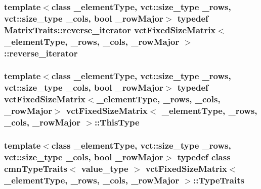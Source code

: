\hypertarget{classvct_fixed_size_matrix_afd9b320069fbb9b20f3dc11d767b57c9}{
\subsubsection[{reverse\-\_\-iterator}]{\setlength{\rightskip}{0pt plus 5cm}template$<$class \-\_\-element\-Type, vct\-::size\-\_\-type \-\_\-rows, vct\-::size\-\_\-type \-\_\-cols, bool \-\_\-row\-Major$>$ typedef {\bf Matrix\-Traits\-::reverse\-\_\-iterator} {\bf vct\-Fixed\-Size\-Matrix}$<$ \-\_\-element\-Type, \-\_\-rows, \-\_\-cols, \-\_\-row\-Major $>$\-::{\bf reverse\-\_\-iterator}}}\label{classvct_fixed_size_matrix_afd9b320069fbb9b20f3dc11d767b57c9}
\hypertarget{classvct_fixed_size_matrix_a45edd9a8b579712a59b766f04e1acfec}{
\subsubsection[{This\-Type}]{\setlength{\rightskip}{0pt plus 5cm}template$<$class \-\_\-element\-Type, vct\-::size\-\_\-type \-\_\-rows, vct\-::size\-\_\-type \-\_\-cols, bool \-\_\-row\-Major$>$ typedef {\bf vct\-Fixed\-Size\-Matrix}$<$\-\_\-element\-Type, \-\_\-rows, \-\_\-cols, \-\_\-row\-Major$>$ {\bf vct\-Fixed\-Size\-Matrix}$<$ \-\_\-element\-Type, \-\_\-rows, \-\_\-cols, \-\_\-row\-Major $>$\-::{\bf This\-Type}}}\label{classvct_fixed_size_matrix_a45edd9a8b579712a59b766f04e1acfec}
\hypertarget{classvct_fixed_size_matrix_af4fb2be82acfa34201da6c7f21ad0e68}{
\subsubsection[{Type\-Traits}]{\setlength{\rightskip}{0pt plus 5cm}template$<$class \-\_\-element\-Type, vct\-::size\-\_\-type \-\_\-rows, vct\-::size\-\_\-type \-\_\-cols, bool \-\_\-row\-Major$>$ typedef class {\bf cmn\-Type\-Traits}$<$ value\-\_\-type $>$ {\bf vct\-Fixed\-Size\-Matrix}$<$ \-\_\-element\-Type, \-\_\-rows, \-\_\-cols, \-\_\-row\-Major $>$\-::{\bf Type\-Traits}}}\label{classvct_fixed_size_matrix_af4fb2be82acfa34201da6c7f21ad0e68}


